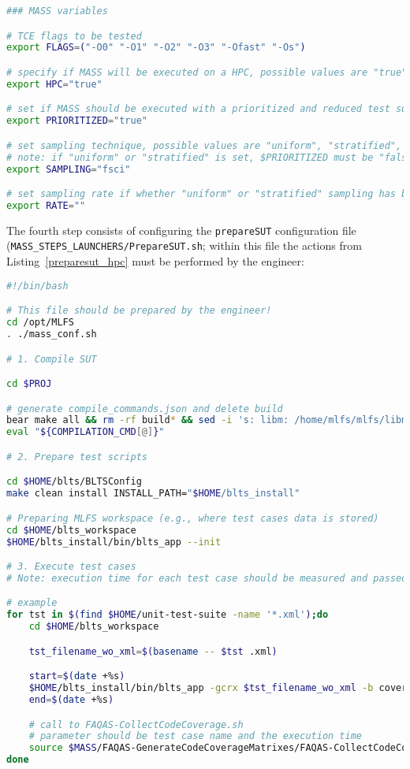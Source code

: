 \begin{lstlisting}[language=bash, label=mutation_additional_hpc_mass ,caption=\MASS specific variables. Excerpt of mass\_conf.sh file.]
### MASS variables

# TCE flags to be tested
export FLAGS=("-O0" "-O1" "-O2" "-O3" "-Ofast" "-Os")

# specify if MASS will be executed on a HPC, possible values are "true" or "false"
export HPC="true"

# set if MASS should be executed with a prioritized and reduced test suite
export PRIORITIZED="true"

# set sampling technique, possible values are "uniform", "stratified", and "fsci"
# note: if "uniform" or "stratified" is set, $PRIORITIZED must be "false"
export SAMPLING="fsci"

# set sampling rate if whether "uniform" or "stratified" sampling has been selected
export RATE=""
\end{lstlisting}

The fourth step consists of configuring the \texttt{prepareSUT} configuration file \\(\texttt{MASS\_STEPS\_LAUNCHERS/PrepareSUT.sh}; within this file the actions from Listing~\ref{preparesut_hpc} must be performed by the engineer:

\begin{lstlisting}[language=bash, label=preparesut_hpc ,caption=\MASS PrepareSUT.sh file.]
#!/bin/bash

# This file should be prepared by the engineer!
cd /opt/MLFS
. ./mass_conf.sh

# 1. Compile SUT

cd $PROJ

# generate compile_commands.json and delete build
bear make all && rm -rf build* && sed -i 's: libm: /home/mlfs/mlfs/libm:' compile_commands.json && mv compile_commands.json $MUTANTS_DIR
eval "${COMPILATION_CMD[@]}"

# 2. Prepare test scripts

cd $HOME/blts/BLTSConfig
make clean install INSTALL_PATH="$HOME/blts_install"

# Preparing MLFS workspace (e.g., where test cases data is stored)
cd $HOME/blts_workspace
$HOME/blts_install/bin/blts_app --init

# 3. Execute test cases
# Note: execution time for each test case should be measured and passed as argument to FAQAS-CollectCodeCoverage.sh

# example
for tst in $(find $HOME/unit-test-suite -name '*.xml');do
    cd $HOME/blts_workspace

    tst_filename_wo_xml=$(basename -- $tst .xml)

    start=$(date +%s)
    $HOME/blts_install/bin/blts_app -gcrx $tst_filename_wo_xml -b coverage --nocsv -s $tst
    end=$(date +%s)

    # call to FAQAS-CollectCodeCoverage.sh
    # parameter should be test case name and the execution time
    source $MASS/FAQAS-GenerateCodeCoverageMatrixes/FAQAS-CollectCodeCoverage.sh $tst_filename_wo_xml "$(($end-$start))"
done
\end{lstlisting}

